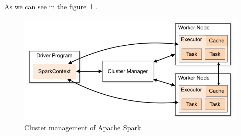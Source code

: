 As we can see in the figure~\ref{fig:clusters-spark} .
\begin{figure}[h]
	\centering
	\includegraphics[scale=0.5]{figs/cluster-overview.png}
	\caption{Cluster management of Apache Spark}
	\label{fig:clusters-spark}
\end{figure}

